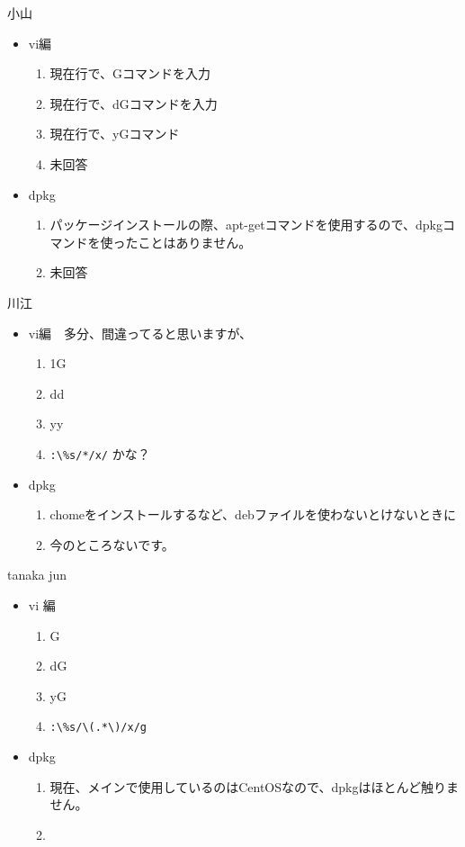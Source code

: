\documentclass[mingoth,a4paper]{jsarticle}
\begin{document}
\begin{prework}{ 小山 }
  \begin{itemize}
  \item vi編
    \begin{enumerate}
    \item 現在行で、Gコマンドを入力
    \item 現在行で、dGコマンドを入力
    \item 現在行で、yGコマンド
    \item 未回答
    \end{enumerate}
  \item dpkg
    \begin{enumerate}
    \item パッケージインストールの際、apt-getコマンドを使用するので、dpkgコマンドを使ったことはありません。
    \item 未回答
    \end{enumerate}
  \end{itemize}
\end{prework}

\begin{prework}{ 川江 }
  \begin{itemize}
  \item vi編　多分、間違ってると思いますが、
    \begin{enumerate}
    \item 1G
    \item dd
    \item yy
    \item \verb+:\%s/*/x/+ かな？
    \end{enumerate}
  \item dpkg
    \begin{enumerate}
    \item chomeをインストールするなど、debファイルを使わないとけないときに
    \item 今のところないです。
    \end{enumerate}
  \end{itemize}
\end{prework}

\begin{prework}{ tanaka jun }
  \begin{itemize}
  \item vi 編
    \begin{enumerate}
    \item G
    \item dG
    \item yG
    \item \verb+:\%s/\(.*\)/x/g+
    \end{enumerate}
  \item dpkg
    \begin{enumerate}
    \item 現在、メインで使用しているのはCentOSなので、dpkgはほとんど触りません。
    \item
    \end{enumerate}
  \end{itemize}
\end{prework}
\end{document}
